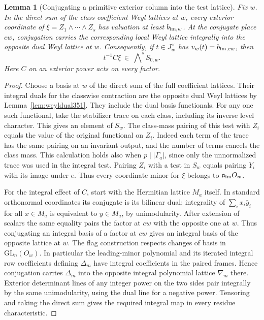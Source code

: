 \documentclass[a4paper,11pt]{article}
\newtheorem{lemma}[proposition]{Lemma}
\theoremstyle{definition}
\theoremstyle{remark}
\numberwithin{equation}{section}
\begin{document}
\begin{lemma}[Conjugating a primitive exterior column into the test lattice]\leavevmode
\label{lem:exteriorcontent448}
Fix \(w\). In the direct sum of the class coefficient Weyl
lattices at \(w\), every exterior coordinate of
\(\xi=Z_1\wedge\cdots\wedge Z_s\) has valuation at least
\(b_{{\rm im},w}\). At the conjugate place \(cw\), conjugation
carries the corresponding local Weyl lattice integrally into
the opposite dual Weyl lattice at \(w\). Consequently, if
\(t\in J_w^\times\) has \(v_w(t)=b_{{\rm im},cw}\), then
\[
                    t^{-1}C\xi\ \in\ \bigwedge\nolimits^s S_{0,w}.
\]
Here \(C\) on an exterior power acts on every factor.
\end{lemma}
\begin{proof}
Choose a basis at \(w\) of the direct sum of the full coefficient
lattices. Their integral duals for the classwise contraction
are the opposite dual Weyl lattices by
Lemma~\ref{lem:weyldual351}. They include the dual basis
functionals. For any one such functional, take the stabilizer
trace on each class, including its inverse level character.
This gives an element of \(S_w\). The class-mass pairing of this
test with \(Z_i\) equals the value of the original functional
on \(Z_i\). Indeed each term of the trace has the same pairing
on an invariant output, and the number of terms cancels the
class mass. This calculation holds also when \(p\mid|\Gamma_a|\),
since only the unnormalized trace was used in the integral test.
Pairing \(Z_i\) with a test in \(S_w\) equals pairing \(Y_i\)
with its image under \(e\). Thus every coordinate minor for
\(\xi\) belongs to \(\mathfrak a_{\rm im}O_w\).

For the integral effect of \(C\), start with the Hermitian
lattice \(M_a\) itself. In standard orthonormal coordinates its
conjugate is its bilinear dual: integrality of
\(\sum_i x_i\bar y_i\) for all \(x\in M_a\) is equivalent to
\(y\in M_a\), by unimodularity. After extension of scalars the
same equality pairs the factor at \(cw\) with the opposite one
at \(w\). Thus conjugating an integral basis of a factor at
\(cw\) gives an integral basis of the opposite lattice at \(w\).
The flag construction respects changes of basis in
\(\mathrm{GL}_n(O_w)\). In particular the leading-minor polynomial
and its iterated integral row coefficients defining \(\Delta_m\)
have integral coefficients in the paired frames. Hence conjugation
carries \(\Delta_m\) into the opposite integral polynomial
lattice \(\nabla_m\) there. Exterior determinant lines of any
integer power on the two sides pair integrally by the same
unimodularity, using the dual line for a negative power.
Tensoring and taking the direct sum gives the required integral
map in every residue characteristic.


\end{proof}
\end{document}
